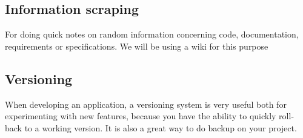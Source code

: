 \subsection{Information scraping}
For doing quick notes on random information concerning code, documentation, requirements or specifications. We will be using a wiki for this purpose

\subsection{Versioning}
When developing an application, a versioning system is very useful both for experimenting with new features, because you have the ability to quickly roll-back to a working version. It is also a great way to do backup on your project.
